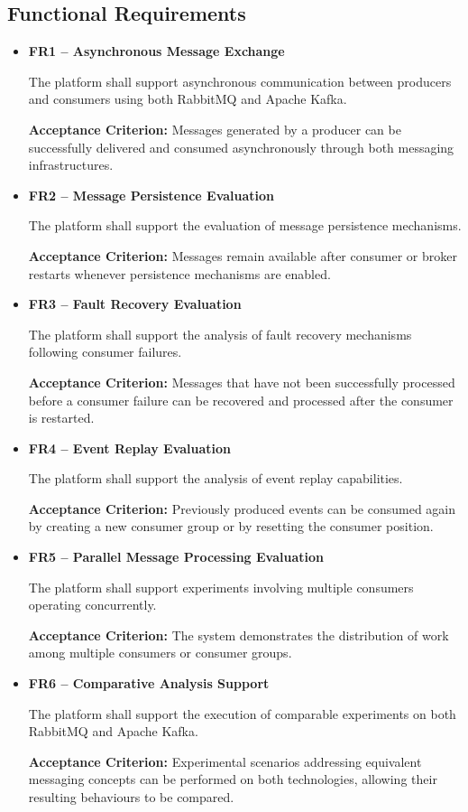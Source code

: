 \documentclass{scrartcl}
\begin{document}
\subsection{Functional Requirements}

\begin{itemize}

\item \textbf{FR1 -- Asynchronous Message Exchange}

The platform shall support asynchronous communication between producers and consumers using both RabbitMQ and Apache Kafka.

\textbf{Acceptance Criterion:}
Messages generated by a producer can be successfully delivered and consumed asynchronously through both messaging infrastructures.

\item \textbf{FR2 -- Message Persistence Evaluation}

The platform shall support the evaluation of message persistence mechanisms.

\textbf{Acceptance Criterion:}
Messages remain available after consumer or broker restarts whenever persistence mechanisms are enabled.

\item \textbf{FR3 -- Fault Recovery Evaluation}

The platform shall support the analysis of fault recovery mechanisms following consumer failures.

\textbf{Acceptance Criterion:}
Messages that have not been successfully processed before a consumer failure can be recovered and processed after the consumer is restarted.

\item \textbf{FR4 -- Event Replay Evaluation}

The platform shall support the analysis of event replay capabilities.

\textbf{Acceptance Criterion:}
Previously produced events can be consumed again by creating a new consumer group or by resetting the consumer position.

\item \textbf{FR5 -- Parallel Message Processing Evaluation}

The platform shall support experiments involving multiple consumers operating concurrently.

\textbf{Acceptance Criterion:}
The system demonstrates the distribution of work among multiple consumers or consumer groups.

\item \textbf{FR6 -- Comparative Analysis Support}

The platform shall support the execution of comparable experiments on both RabbitMQ and Apache Kafka.

\textbf{Acceptance Criterion:}
 Experimental scenarios addressing equivalent messaging concepts can be performed on both technologies, allowing their resulting behaviours to be compared.

\end{itemize}
\end{document}
